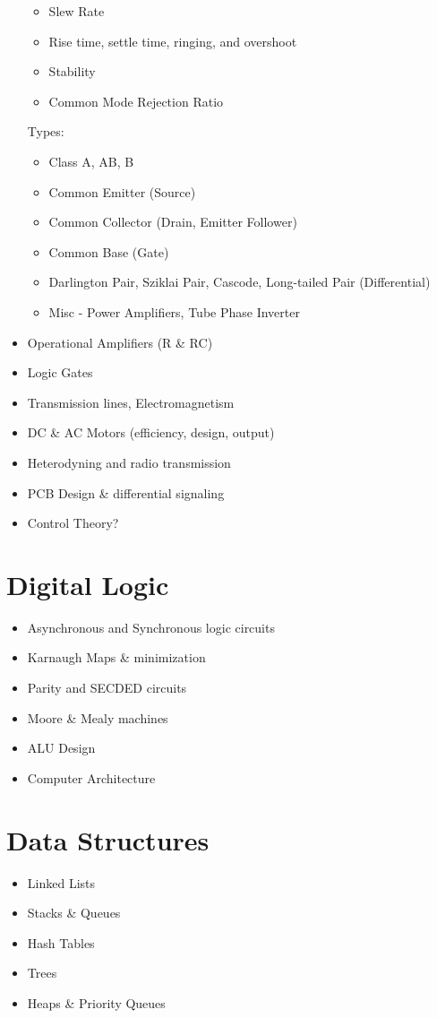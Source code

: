 \documentclass[a4paper]{article}
\begin{document}
\begin{itemize}
\begin{itemize}
  \item Slew Rate
  \item Rise time, settle time, ringing, and overshoot
  \item Stability
  \item Common Mode Rejection Ratio
  \end{itemize}
  Types:
  \begin{itemize}
  \item Class A, AB, B
  \item Common Emitter (Source)
  \item Common Collector (Drain, Emitter Follower)
  \item Common Base (Gate)
  \item Darlington Pair, Sziklai Pair, Cascode, Long-tailed Pair (Differential)
  \item Misc - Power Amplifiers, Tube Phase Inverter
  \end{itemize}
\item Operational Amplifiers (R \& RC)
\item Logic Gates
\item Transmission lines, Electromagnetism
\item DC \& AC Motors (efficiency, design, output)
\item Heterodyning and radio transmission
\item PCB Design \& differential signaling
\item Control Theory?
\end{itemize}

\section{Digital Logic}
\begin{itemize}
\item Asynchronous and Synchronous logic circuits
\item Karnaugh Maps \& minimization
\item Parity and SECDED circuits
\item Moore \& Mealy machines
\item ALU Design
\item Computer Architecture
\end{itemize}

\section{Data Structures}
\begin{itemize}
\item Linked Lists
\item Stacks \& Queues
\item Hash Tables
\item Trees
\item Heaps \& Priority Queues
\end{itemize}
\end{document}
